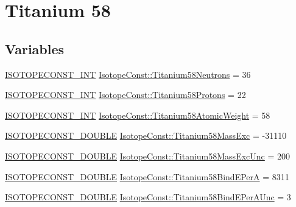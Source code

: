 \hypertarget{group___isotope_const-_titanium-_ti58}{}\section{Titanium 58}
\label{group___isotope_const-_titanium-_ti58}
\subsection*{Variables}
\begin{DoxyCompactItemize}
\item 
\mbox{\hyperlink{group___isotope_const-_macros_ga5f18360b3e99483a35c32d789e62621c}{I\+S\+O\+T\+O\+P\+E\+C\+O\+N\+S\+T\+\_\+\+I\+NT}} \mbox{\hyperlink{group___isotope_const-_titanium-_ti58_ga44ad2e952beec8f48895612c893141d4}{Isotope\+Const\+::\+Titanium58\+Neutrons}} = 36
\item 
\mbox{\hyperlink{group___isotope_const-_macros_ga5f18360b3e99483a35c32d789e62621c}{I\+S\+O\+T\+O\+P\+E\+C\+O\+N\+S\+T\+\_\+\+I\+NT}} \mbox{\hyperlink{group___isotope_const-_titanium-_ti58_ga3fdcfef6771543195fc1fd83c99df89a}{Isotope\+Const\+::\+Titanium58\+Protons}} = 22
\item 
\mbox{\hyperlink{group___isotope_const-_macros_ga5f18360b3e99483a35c32d789e62621c}{I\+S\+O\+T\+O\+P\+E\+C\+O\+N\+S\+T\+\_\+\+I\+NT}} \mbox{\hyperlink{group___isotope_const-_titanium-_ti58_gaa9f23f650a5c1faa51fc5d3f5936e3a3}{Isotope\+Const\+::\+Titanium58\+Atomic\+Weight}} = 58
\item 
\mbox{\hyperlink{group___isotope_const-_macros_ga8f45a7272ce02c0b4c65c44636ed719a}{I\+S\+O\+T\+O\+P\+E\+C\+O\+N\+S\+T\+\_\+\+D\+O\+U\+B\+LE}} \mbox{\hyperlink{group___isotope_const-_titanium-_ti58_ga641457051ea871fa9bf9ee9d4a20bdd1}{Isotope\+Const\+::\+Titanium58\+Mass\+Exc}} = -\/31110
\item 
\mbox{\hyperlink{group___isotope_const-_macros_ga8f45a7272ce02c0b4c65c44636ed719a}{I\+S\+O\+T\+O\+P\+E\+C\+O\+N\+S\+T\+\_\+\+D\+O\+U\+B\+LE}} \mbox{\hyperlink{group___isotope_const-_titanium-_ti58_ga0b93fd9bcdea6ffbc649fc0d2a867c2d}{Isotope\+Const\+::\+Titanium58\+Mass\+Exc\+Unc}} = 200
\item 
\mbox{\hyperlink{group___isotope_const-_macros_ga8f45a7272ce02c0b4c65c44636ed719a}{I\+S\+O\+T\+O\+P\+E\+C\+O\+N\+S\+T\+\_\+\+D\+O\+U\+B\+LE}} \mbox{\hyperlink{group___isotope_const-_titanium-_ti58_ga4af8ec068300caf09a281cd12981deca}{Isotope\+Const\+::\+Titanium58\+Bind\+E\+PerA}} = 8311
\item 
\mbox{\hyperlink{group___isotope_const-_macros_ga8f45a7272ce02c0b4c65c44636ed719a}{I\+S\+O\+T\+O\+P\+E\+C\+O\+N\+S\+T\+\_\+\+D\+O\+U\+B\+LE}} \mbox{\hyperlink{group___isotope_const-_titanium-_ti58_ga30b9382809b343443e6ef269193ccb53}{Isotope\+Const\+::\+Titanium58\+Bind\+E\+Per\+A\+Unc}} = 3

\end{DoxyCompactItemize}
